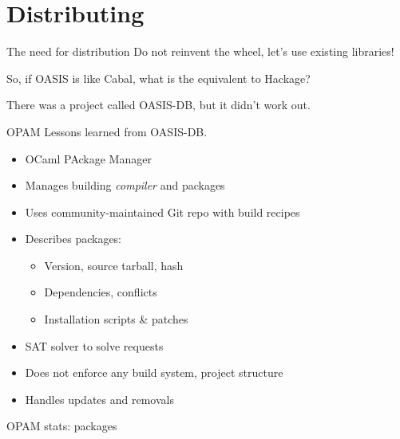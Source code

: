 \documentclass{beamer}
\begin{document}
\section{Distributing}

\begin{frame}{The need for distribution}
  Do not reinvent the wheel, let's use existing libraries!

  So, if OASIS is like Cabal, what is the equivalent to Hackage? \pause

  There was a project called OASIS-DB, but it didn't work out.
\end{frame}

\begin{frame}{OPAM}
  Lessons learned from OASIS-DB.
  \begin{itemize}
    \item OCaml PAckage Manager
    \item Manages building \emph{compiler} and packages
    \item Uses community-maintained Git repo with build recipes
    \item Describes packages:
      \begin{itemize}
        \item Version, source tarball, hash
        \item Dependencies, conflicts
        \item Installation scripts \& patches
      \end{itemize}
    \item SAT solver to solve requests
    \item Does not enforce any build system, project structure
    \item Handles updates and removals
  \end{itemize}
\end{frame}

\begin{frame}{OPAM stats: packages}
\end{frame}
\end{document}
